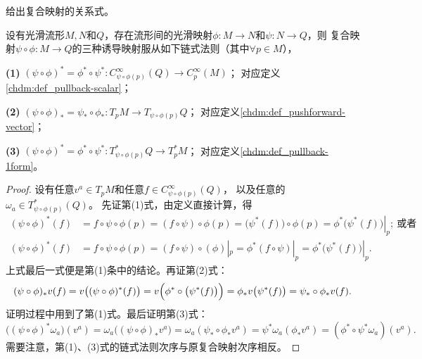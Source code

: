 给出复合映射的关系式。
\begin{theorem}\label{chdm:thm_map-chain-rule}
    设有光滑流形$M,N$和$Q$，存在流形间的光滑映射$\phi:M\to N$和$\psi:N\to Q$，则
    复合映射$ \psi\circ\phi  : M\to Q$的三种诱导映射服从如下链式法则（其中$\forall p\in M$），
    
    {\bfseries (1)} $(\psi\circ \phi)^{*}= \phi^{*}\circ \psi^{*}:  C^{\infty}_{\psi\circ\phi(p)}(Q)\to C^{\infty}_p (M)$；
    对应定义\ref{chdm:def_pullback-scalar}；
    
    {\bfseries (2)} $(\psi\circ \phi)_{*}= \psi_{*}\circ \phi_{*}: T_p M\to T_{\psi\circ\phi(p)}Q$；
    对应定义\ref{chdm:def_pushforward-vector}；
    
    {\bfseries (3)} $(\psi\circ \phi)^{*}= \phi^{*}\circ \psi^{*}:  T^{*}_{\psi\circ\phi(p)}Q\to T^{*}_p M$；
    对应定义\ref{chdm:def_pullback-1form}。
\end{theorem}
\begin{proof}
    设有任意$v^a\in T_pM$和任意$f\in C^\infty_{\psi\circ\phi(p)}(Q)$，
    以及任意的$\omega_a\in T^{*}_{\psi\circ\phi(p)}(Q)$。
    先证第(1)式，由定义直接计算，得
    \begin{align*}
        (\psi\circ \phi)^{*} (f) &= f\circ \psi\circ \phi (p) = (f\circ \psi )\circ \phi (p)
        =\bigl(\psi^*(f) \bigr)\circ \phi (p) = \left. \phi^*\bigl(\psi^*(f) \bigr) \right|_p;
        \ \text{或者} \\
        (\psi\circ \phi)^{*} (f) &= f\circ \psi\circ \phi (p) = (f\circ \psi )\circ (\phi)|_p
        =\phi^* (f\circ \psi )|_p = \left. \phi^*\bigl(\psi^*(f) \bigr) \right|_p .
    \end{align*}
    上式最后一式便是第(1)条中的结论。再证第(2)式：
    \begin{equation*}
        (\psi\circ \phi)_{*}v (f) = v \bigl((\psi\circ \phi)^{*} (f)\bigr)
          =v \Bigl(\phi^{*}\circ \bigl( \psi^{*} (f)\bigr) \Bigr)
          =\phi_{*} v \bigl( \psi^{*} (f)\bigr) =\psi_{*} \circ \phi_{*} v (f) .
    \end{equation*}
    证明过程中用到了第(1)式。最后证明第(3)式：
    \begin{equation*}
        \bigl((\psi\circ \phi)^{*} \omega_a\bigr) (v^a) = \omega_a \bigl((\psi\circ \phi)_{*} v^a\bigr)
        = \omega_a (\psi_{*} \circ \phi_{*}  v^a )
        = \psi^{*} \omega_a ( \phi_{*}  v^a)
        = (\phi^{*}\circ \psi^{*} \omega_a) (v^a) .
    \end{equation*}
    需要注意，第(1)、(3)式的链式法则次序与原复合映射次序相反。
\end{proof}


